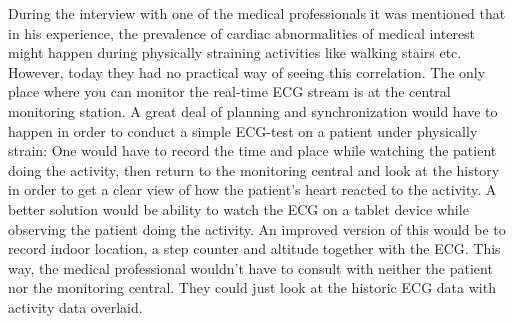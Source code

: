 During the interview with one of the medical professionals it was mentioned that in his experience, the prevalence of cardiac abnormalities of medical interest might happen during physically straining activities like walking stairs etc. However, today they had no practical way of seeing this correlation. The only place where you can monitor the real-time ECG stream is at the central monitoring station. A great deal of planning and synchronization would have to happen in order to conduct a simple ECG-test on a patient under physically strain: One would have to record the time and place while watching the patient doing the activity, then return to the monitoring central and look at the history in order to get a clear view of how the patient's heart reacted to the activity. A better solution would be ability to watch the ECG on a tablet device while observing the patient doing the activity. An improved version of this would be to record indoor location, a step counter and altitude together with the ECG. This way, the medical professional wouldn't have to consult with neither the patient nor the monitoring central. They could just look at the historic ECG data with activity data overlaid.


